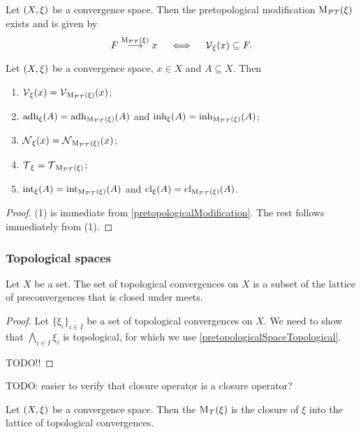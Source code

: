 \begin{proposition} \label{pretopologicalModification}
Let $\sSet{X,\xi}$ be a convergence space. Then the pretopological modification $\operatorname{M_\mathcal{PT}}(\xi)$ exists and is given by
\[ F \overset{\operatorname{M_\mathcal{PT}}(\xi)}{\longrightarrow} x \quad\iff\quad \operatorname{\mathcal{V}}_\xi(x) \subseteq F. \]
\end{proposition}

\begin{lemma}
Let $\sSet{X,\xi}$ be a convergence space, $x\in X$ and $A\subseteq X$. Then
\begin{enumerate}
\item $\operatorname{\mathcal{V}}_{\xi}(x) = \operatorname{\mathcal{V}}_{\operatorname{M_\mathcal{PT}}(\xi)}(x)$;
\item $\operatorname{adh}_\xi(A) = \operatorname{adh}_{\operatorname{M_\mathcal{PT}}(\xi)}(A)$ and $\operatorname{inh}_\xi(A) = \operatorname{inh}_{\operatorname{M_\mathcal{PT}}(\xi)}(A)$;
\item $\operatorname{\mathcal{N}}_{\xi}(x) = \operatorname{\mathcal{N}}_{\operatorname{M_\mathcal{PT}}(\xi)}(x)$;
\item $\operatorname{\mathcal{T}}_{\xi} = \operatorname{\mathcal{T}}_{\operatorname{M_\mathcal{PT}}(\xi)}$;
\item $\operatorname{int}_\xi(A) = \operatorname{int}_{\operatorname{M_\mathcal{PT}}(\xi)}(A)$ and $\operatorname{cl}_\xi(A) = \operatorname{cl}_{\operatorname{M_\mathcal{PT}}(\xi)}(A)$.
\end{enumerate}
\end{lemma}
\begin{proof}
(1) is immediate from \ref{pretopologicalModification}. The rest follows immediately from (1).
\end{proof}


\subsubsection{Topological spaces}
\begin{lemma}
Let $X$ be a set. The set of topological convergences on $X$ is a subset of the lattice of preconvergences that is closed under meets.
\end{lemma}
\begin{proof}
Let $\{\xi_i\}_{i\in I}$ be a set of topological convergences on $X$. We need to show that $\bigwedge_{i\in I}\xi_i$ is topological, for which we use \ref{pretopologicalSpaceTopological}.

TODO!!
\end{proof}
TODO: easier to verify that closure operator is a closure operator?

\begin{definition}
Let $\sSet{X,\xi}$ be a convergence space. Then the  $\operatorname{M_\mathcal{T}}(\xi)$ is the closure of $\xi$ into the lattice of topological convergences.
\end{definition}

